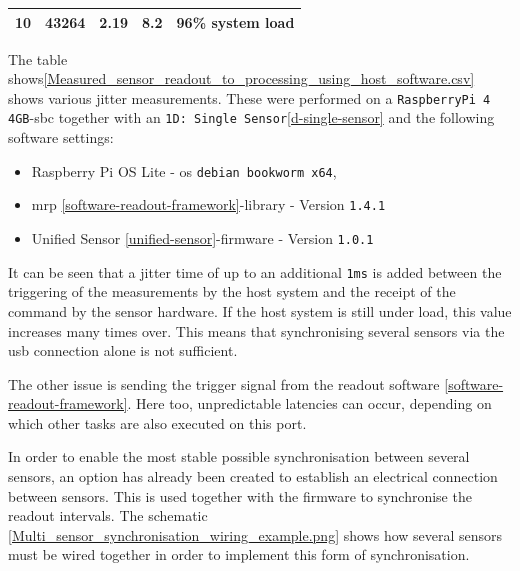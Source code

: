 \begin{longtable}[]{@{}lllll@{}}
\begin{minipage}[t]{0.08\columnwidth}\raggedright
10\strut
\end{minipage} & \begin{minipage}[t]{0.11\columnwidth}\raggedright
43264\strut
\end{minipage} & \begin{minipage}[t]{0.35\columnwidth}\raggedright
2.19\strut
\end{minipage} & \begin{minipage}[t]{0.22\columnwidth}\raggedright
8.2\strut
\end{minipage} & \begin{minipage}[t]{0.10\columnwidth}\raggedright
96\% system load\strut
\end{minipage}\tabularnewline
\bottomrule
\end{longtable}

The table
shows\ref{Measured_sensor_readout_to_processing_using_host_software.csv}
shows various jitter measurements. These were performed on a
\passthrough{\lstinline!RaspberryPi 4 4GB!}-\gls{sbc} together with an
\passthrough{\lstinline!1D: Single Sensor!}\ref{d-single-sensor} and the
following software settings:

\begin{itemize}
\tightlist
\item
  Raspberry Pi OS Lite - \gls{os}
  \passthrough{\lstinline!debian bookworm x64!},
\item
  \gls{mrp} \ref{software-readout-framework}-library - Version
  \passthrough{\lstinline!1.4.1!}
\item
  Unified Sensor \ref{unified-sensor}-firmware - Version
  \passthrough{\lstinline!1.0.1!}
\end{itemize}

It can be seen that a jitter time of up to an additional
\passthrough{\lstinline!1ms!} is added between the triggering of the
measurements by the host system and the receipt of the command by the
sensor hardware. If the host system is still under load, this value
increases many times over. This means that synchronising several sensors
via the \gls{usb} connection alone is not sufficient.

The other issue is sending the trigger signal from the readout software
\ref{software-readout-framework}. Here too, unpredictable latencies can
occur, depending on which other tasks are also executed on this port.

In order to enable the most stable possible synchronisation between
several sensors, an option has already been created to establish an
electrical connection between sensors. This is used together with the
firmware to synchronise the readout intervals. The schematic
\ref{Multi_sensor_synchronisation_wiring_example.png} shows how several
sensors must be wired together in order to implement this form of
synchronisation.

